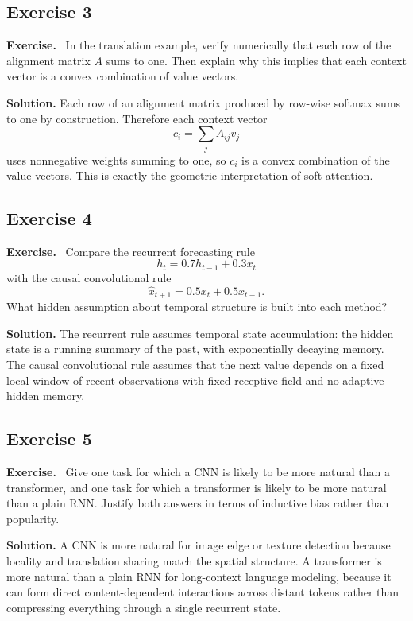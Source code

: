 \documentclass[11pt]{article}
\newenvironment{exercisebox}{\begin{framed}\noindent\textbf{Exercise.}\ }{\end{framed}}
\begin{document}
\subsection*{Exercise 3}
\begin{exercisebox}
In the translation example, verify numerically that each row of the alignment matrix $A$ sums to one.
    Then explain why this implies that each context vector is a convex combination of value vectors.
\end{exercisebox}
\textbf{Solution.} Each row of an alignment matrix produced by row-wise softmax sums to one by construction. Therefore each context vector
\[
c_i=\sum_j A_{ij}v_j
\]
uses nonnegative weights summing to one, so $c_i$ is a convex combination of the value vectors. This is exactly the geometric interpretation of soft attention.

\subsection*{Exercise 4}
\begin{exercisebox}
Compare the recurrent forecasting rule
    \[
    h_t=0.7h_{t-1}+0.3x_t
    \]
    with the causal convolutional rule
    \[
    \hat{x}_{t+1}=0.5x_t+0.5x_{t-1}.
    \]
    What hidden assumption about temporal structure is built into each method?
\end{exercisebox}
\textbf{Solution.} The recurrent rule assumes temporal state accumulation: the hidden state is a running summary of the past, with exponentially decaying memory. The causal convolutional rule assumes that the next value depends on a fixed local window of recent observations with fixed receptive field and no adaptive hidden memory.

\subsection*{Exercise 5}
\begin{exercisebox}
Give one task for which a CNN is likely to be more natural than a transformer, and one task for which a transformer is likely to be more natural than a plain RNN.
    Justify both answers in terms of inductive bias rather than popularity.
\end{exercisebox}
\textbf{Solution.} A CNN is more natural for image edge or texture detection because locality and translation sharing match the spatial structure. A transformer is more natural than a plain RNN for long-context language modeling, because it can form direct content-dependent interactions across distant tokens rather than compressing everything through a single recurrent state.
\end{document}
